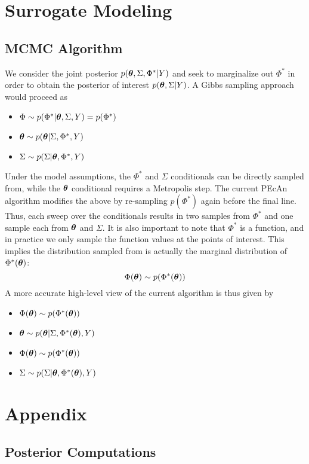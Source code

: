 \documentclass[12pt]{article}
\begin{document}
\section{Surrogate Modeling}

\subsection{MCMC Algorithm}
We consider the joint posterior $p(\boldsymbol{\theta}, \Sigma, \Phi^*|Y)$ and seek to marginalize out $\Phi^*$ in order to obtain the posterior of interest $p(\boldsymbol{\theta}, \Sigma|Y)$. A Gibbs sampling approach would proceed as 
\begin{itemize}
\item $\Phi \sim p(\Phi^*|\boldsymbol{\theta}, \Sigma, Y) = p(\Phi^*)$
\item $\boldsymbol{\theta} \sim p(\boldsymbol{\theta}|\Sigma, \Phi^*, Y)$
\item $\Sigma \sim p(\Sigma|\boldsymbol{\theta}, \Phi^*, Y)$
\end{itemize}
Under the model assumptions, the $\Phi^*$ and $\Sigma$ conditionals can be directly sampled from, while the $\boldsymbol{\theta}$ conditional requires a Metropolis step. The current PEcAn algorithm modifies the above by re-sampling 
$p(\Phi^*)$ again before the final line. Thus, each sweep over the conditionals results in two samples from $\Phi^*$ and one sample each from $\boldsymbol{\theta}$ and $\Sigma$. It is also important to note that 
$\Phi^*$ is a function, and in practice we only sample the function values at the points of interest. This implies the distribution sampled from is actually the marginal distribution of $\Phi^*(\boldsymbol{\theta})$:
\[\Phi(\boldsymbol{\theta}) \sim p(\Phi^*(\boldsymbol{\theta}))\]
A more accurate high-level view of the current algorithm is thus given by 
\begin{itemize}
\item $\Phi(\boldsymbol{\theta}) \sim p(\Phi^*(\boldsymbol{\theta}))$
\item $\boldsymbol{\theta} \sim p(\boldsymbol{\theta}|\Sigma, \Phi^*(\boldsymbol{\theta}), Y)$
\item $\Phi(\boldsymbol{\theta}) \sim p(\Phi^*(\boldsymbol{\theta}))$
\item $\Sigma \sim p(\Sigma|\boldsymbol{\theta}, \Phi^*(\boldsymbol{\theta}), Y)$
\end{itemize}

\section{Appendix}

\subsection{Posterior Computations}
\end{document}
